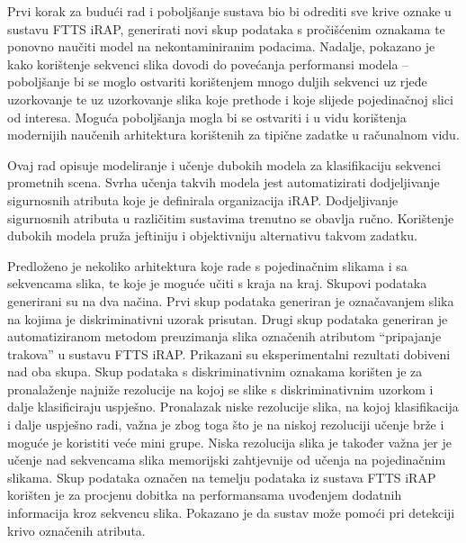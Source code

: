 \documentclass[times, utf8, diplomski, numeric]{fer}
\begin{document}
Prvi korak za budući rad i poboljšanje sustava bio bi odrediti sve krive oznake u sustavu FTTS iRAP, generirati novi skup podataka s pročišćenim oznakama te ponovno naučiti model na nekontaminiranim podacima.
Nadalje, pokazano je kako korištenje sekvenci slika dovodi do povećanja performansi modela -- poboljšanje bi se moglo ostvariti korištenjem mnogo duljih sekvenci uz rjeđe uzorkovanje te uz uzorkovanje slika koje prethode i koje slijede pojedinačnoj slici od interesa. 
Moguća poboljšanja mogla bi se ostvariti i u vidu korištenja modernijih naučenih arhitektura korištenih za tipične zadatke u računalnom vidu.




\begin{sazetak}
Ovaj rad opisuje modeliranje i učenje dubokih modela za klasifikaciju sekvenci prometnih scena.
Svrha učenja takvih modela jest automatizirati dodjeljivanje sigurnosnih atributa koje je definirala organizacija iRAP.
Dodjeljivanje sigurnosnih atributa u različitim sustavima trenutno se obavlja ručno.
Korištenje dubokih modela pruža jeftiniju i objektivniju alternativu takvom zadatku.

Predloženo je nekoliko arhitektura koje rade s pojedinačnim slikama i sa sekvencama slika, te koje je moguće učiti s kraja na kraj.
Skupovi podataka generirani su na dva načina. Prvi skup podataka generiran je označavanjem slika na kojima je diskriminativni uzorak prisutan.
Drugi skup podataka generiran je automatiziranom metodom preuzimanja slika označenih atributom ``pripajanje trakova'' u sustavu FTTS iRAP.
Prikazani su eksperimentalni rezultati dobiveni nad oba skupa.
Skup podataka s diskriminativnim oznakama korišten je za pronalaženje najniže rezolucije na kojoj se slike s diskriminativnim uzorkom i dalje klasificiraju uspješno. 
Pronalazak niske rezolucije slika, na kojoj klasifikacija i dalje uspješno radi, važna je zbog toga što je na niskoj rezoluciji učenje brže i moguće je koristiti veće mini grupe.
Niska rezolucija slika je također važna jer je učenje nad sekvencama slika memorijski zahtjevnije od učenja na pojedinačnim slikama.
Skup podataka označen na temelju podataka iz sustava FTTS iRAP korišten je za procjenu dobitka na performansama uvođenjem dodatnih informacija kroz sekvencu slika.
Pokazano je da sustav može pomoći pri detekciji krivo označenih atributa.


 \\
\end{sazetak}
\end{document}
